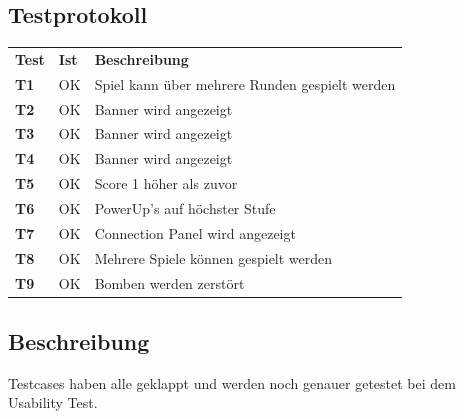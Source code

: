 \documentclass[11pt]{scrartcl}
\begin{document}
\subsection{Testprotokoll}
\begin{tabularx}{\linewidth}{l l X}
  \bf{Test} & \bf{Ist} & \bf{Beschreibung} \\
  \bf{T1} & OK & Spiel kann über mehrere Runden gespielt werden\\
  \bf{T2} & OK &  Banner wird angezeigt \\
  \bf{T3} & OK  & Banner wird angezeigt \\
  \bf{T4} & OK &  Banner wird angezeigt \\
  \bf{T5} & OK & Score 1 höher als zuvor\\
  \bf{T6} & OK &   PowerUp's auf höchster Stufe \\
  \bf{T7} & OK & Connection Panel wird angezeigt\\
  \bf{T8} & OK & Mehrere Spiele können gespielt werden\\
  \bf{T9} & OK & Bomben werden zerstört\\
\end{tabularx}
\subsection{Beschreibung}
Testcases haben alle geklappt und werden noch genauer getestet bei dem Usability 
Test.
\end{document}
